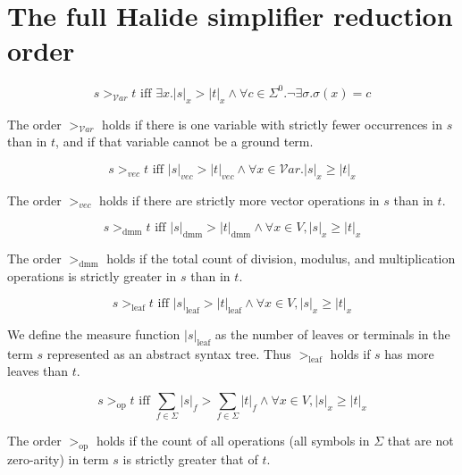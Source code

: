 \chapter{The full Halide simplifier reduction order}
\label{a:sreductionorder}

\begin{equation}
s >_{\mathcal{V}ar} t \textrm{ iff } \exists x . |s|_{x} > |t|_{x} \wedge \forall c \in \Sigma^0 . \lnot \exists \sigma . \sigma(x) = c
\end{equation}

The order $>_{\mathcal{V}ar}$ holds if there is one variable with strictly fewer occurrences in $s$ than in $t$, and if that variable cannot be a ground term. 

\begin{equation}
s >_{vec} t \textrm{ iff } |s|_{vec} > |t|_{vec} \wedge \forall x \in \mathcal{V}ar . |s|_x \geq |t|_x
\end{equation}

The order $>_{vec}$ holds if there are strictly more vector operations in $s$ than in $t$.

\begin{equation}
s >_{\textrm{dmm}} t \textrm{ iff } |s|_{\textrm{dmm}} > |t|_{\textrm{dmm}} \wedge \forall x \in V, |s|_x \geq |t|_x
\end{equation}

The order $>_{\textrm{dmm}}$ holds if the total count of division, modulus, and multiplication operations is strictly greater in $s$ than in $t$.

\begin{equation}
s >_{\textrm{leaf}} t \textrm{ iff } |s|_{\textrm{leaf}} > |t|_{\textrm{leaf}} \wedge \forall x \in V, |s|_x \geq |t|_x
\end{equation}

We define the measure function $|s|_{\textrm{leaf}}$ as the number of leaves or terminals in the term $s$ represented as an abstract syntax tree. Thus $>_{\textrm{leaf}}$ holds if $s$ has more leaves than $t$.

\begin{equation}
s >_{\textrm{op}} t \textrm{ iff } \sum_{f \in \Sigma} |s|_f > \sum_{f \in \Sigma} |t|_f \wedge \forall x \in V, |s|_x \geq |t|_x
\end{equation}

The order $>_{\textrm{op}}$ holds if the count of all operations (all symbols in $\Sigma$ that are not zero-arity) in term $s$ is strictly greater that of $t$.

